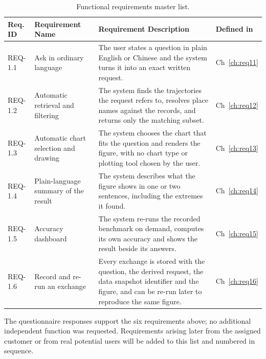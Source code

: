\documentclass[12pt,a4paper]{report}
\begin{document}
\begin{table}[H]
  \centering
  \caption{Functional requirements master list.}
  \label{tab:master}
  \setlength{\tabcolsep}{4.5pt}
  \begin{tabular}{@{}l >{\raggedright\arraybackslash}p{3.6cm} >{\raggedright\arraybackslash}p{7.8cm} l@{}}
    \toprule[1.5pt]
    \textbf{Req. ID} & \textbf{Requirement Name} &
      \textbf{Requirement Description} & \textbf{Defined in} \\
    \midrule
    REQ-1.1 & Ask in ordinary language &
      The user states a question in plain English or Chinese and the system
      turns it into an exact written request. & Ch~\ref{ch:req11} \\
    \addlinespace
    REQ-1.2 & Automatic retrieval and filtering &
      The system finds the trajectories the request refers to, resolves
      place names against the records, and returns only the matching
      subset. & Ch~\ref{ch:req12} \\
    \addlinespace
    REQ-1.3 & Automatic chart selection and drawing &
      The system chooses the chart that fits the question and renders the
      figure, with no chart type or plotting tool chosen by the user.
      & Ch~\ref{ch:req13} \\
    \addlinespace
    REQ-1.4 & Plain-language summary of the result &
      The system describes what the figure shows in one or two sentences,
      including the extremes it found. & Ch~\ref{ch:req14} \\
    \addlinespace
    REQ-1.5 & Accuracy dashboard &
      The system re-runs the recorded benchmark on demand, computes its own
      accuracy and shows the result beside its answers. & Ch~\ref{ch:req15} \\
    \addlinespace
    REQ-1.6 & Record and re-run an exchange &
      Every exchange is stored with the question, the derived request, the
      data snapshot identifier and the figure, and can be re-run later to
      reproduce the same figure. & Ch~\ref{ch:req16} \\
    \bottomrule[1.5pt]
  \end{tabular}
\end{table}

The questionnaire responses support the six requirements above; no
additional independent function was requested. Requirements arising later
from the assigned customer or from real potential users will be added to
this list and numbered in sequence.
\end{document}
